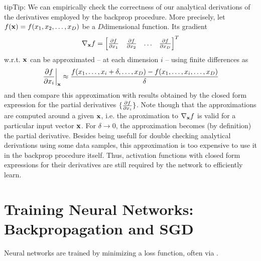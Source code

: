 \documentclass[letterpaper,10pt,english]{jupyterBook}
\begin{document}
\begin{sphinxadmonition}{tip}{Tip:}
\sphinxAtStartPar
We can empirically check the correctness of our analytical derivations of the derivatives employed by the backprop procedure. More precisely, let \(f({\bf x}) = f(x_1, x_2, \dots, x_D)\) be a \(D\)\sphinxhyphen{}dimensional function. Its gradient
\label{equation:neuralnets_backprop:96173ce7-8334-479e-8854-b1382c0605e9}\begin{equation}
\nabla_{{\bf x}} f = \begin{bmatrix} {\partial f \over \partial x_1} & {\partial f \over \partial x_2} & \ldots & {\partial f \over \partial x_D} \end{bmatrix}^{T}
\end{equation}
\sphinxAtStartPar
w.r.t. \( {\bf x} \) can be approximated – at each dimension \( i \) – using finite differences as
\label{equation:neuralnets_backprop:f90b4b64-3a6d-44a7-b76d-e59e9a6e0f9b}\begin{equation}
\left. {\partial f \over \partial x_i} \right|_{{\bf x}} \approx  {f(x_1, \dots, x_i + \delta, \dots, x_D) - f(x_1, \dots, x_i, \dots, x_D) \over \delta}
\end{equation}
\sphinxAtStartPar
and then compare this approximation with results obtained by the closed form expression for the partial derivatives \( \lbrace  {\partial f \over \partial x_i} \rbrace \). Note though that the approximations are computed around a given \( {\bf x} \), i.e. the aproximation to \( \nabla_{{\bf x}} f \) is valid for a particular input vector \( {\bf x} \). For \(\delta \rightarrow 0\), the approximation becomes (by definition) the partial derivative. Besides being usefull for double checking analytical derivations using some data samples, this approximation is too expensive to use it in the backprop procedure itself. Thus, activation functions with closed form expressions for their derivatives are still required by the network to efficiently learn.
\end{sphinxadmonition}

\sphinxstepscope


\section{Training Neural Networks: Backpropagation and SGD}
\label{\detokenize{neuralnets_optimization:training-neural-networks-backpropagation-and-sgd}}\label{\detokenize{neuralnets_optimization::doc}}
\sphinxAtStartPar
Neural networks are trained by minimizing a loss function, often via .
\end{document}
